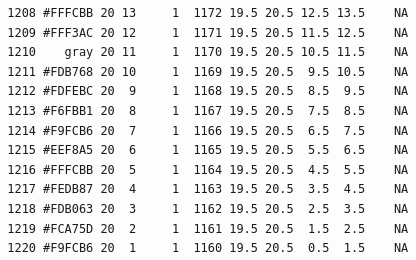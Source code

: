 \documentclass[12pt,twoside]{reedthesis}
\begin{document}
\begin{verbatim}
  1208 #FFFCBB 20 13     1  1172 19.5 20.5 12.5 13.5    NA
  1209 #FFF3AC 20 12     1  1171 19.5 20.5 11.5 12.5    NA
  1210    gray 20 11     1  1170 19.5 20.5 10.5 11.5    NA
  1211 #FDB768 20 10     1  1169 19.5 20.5  9.5 10.5    NA
  1212 #FDFEBC 20  9     1  1168 19.5 20.5  8.5  9.5    NA
  1213 #F6FBB1 20  8     1  1167 19.5 20.5  7.5  8.5    NA
  1214 #F9FCB6 20  7     1  1166 19.5 20.5  6.5  7.5    NA
  1215 #EEF8A5 20  6     1  1165 19.5 20.5  5.5  6.5    NA
  1216 #FFFCBB 20  5     1  1164 19.5 20.5  4.5  5.5    NA
  1217 #FEDB87 20  4     1  1163 19.5 20.5  3.5  4.5    NA
  1218 #FDB063 20  3     1  1162 19.5 20.5  2.5  3.5    NA
  1219 #FCA75D 20  2     1  1161 19.5 20.5  1.5  2.5    NA
  1220 #F9FCB6 20  1     1  1160 19.5 20.5  0.5  1.5    NA
  \end{verbatim}
  
  \begin{Shaded}
  \begin{Highlighting}[]
  \NormalTok{(gcolor$data[[}\NormalTok{]], }\NormalTok{)}
  
  \NormalTok{(}\StringTok{ }\NormalTok{(} \NormalTok{, } \NormalTok{,} \NormalTok{(}\NormalTok{))+}\StringTok{ }\NormalTok{(}\NormalTok{(}\NormalTok{()+}\NormalTok{(} \NormalTok{(} \NormalTok{, } \NormalTok{), } \NormalTok{(} \NormalTok{), } \NormalTok{(}\NormalTok{), }\NormalTok{(} \NormalTok{,} \NormalTok{))+}\StringTok{ }\NormalTok{(} \NormalTok{(}\NormalTok{),} \NormalTok{)}
  \end{Highlighting}
  \end{Shaded}
  
\end{document}
